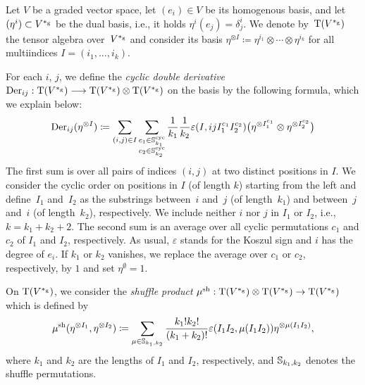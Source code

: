 \documentclass[\MainFolder/Text.tex]{subfiles}
\begin{document}
\begin{Definition}\label{Def:DefOfHochOp}
Let $V$ be a graded vector space, let $(e_i)\in V$ be its homogenous basis, and let $(\eta^i)\subset V^{*_{\mathrm{g}}}$ be the dual basis, i.e., it holds $\eta^i(e_j) = \delta^i_j$. We denote by~$\mathrm{T}(V^{*_{\mathrm{g}}})$ the tensor algebra over~$V^{*_{\mathrm{g}}}$ and consider its basis $\eta^{\otimes I} \coloneqq \eta^{i_1} \otimes \dotsb \otimes \eta^{i_k}$ for all multiindices $I = (i_1,\dotsc,i_k)$.

For each $i$, $j$, we define the \emph{cyclic double derivative} $\mathrm{Der}_{ij}:\mathrm{T}(V^{*_{\mathrm{g}}}) \longrightarrow \mathrm{T}(V^{*_{\mathrm{g}}}) \otimes \mathrm{T}(V^{*_{\mathrm{g}}})$ on the basis by the following formula, which we explain below:
\begin{equation}\label{Eq:DoubleDeriv}
\mathrm{Der}_{ij}(\eta^{\otimes I}) \coloneqq \sum_{(i,j)\in I} \sum_{\substack{c_1 \in \mathbb{S}^{\mathrm{cyc}}_{k_1}\\ c_2 \in \mathbb{S}^{\mathrm{cyc}}_{k_2}}}\frac{1}{k_1}\frac{1}{k_2}\varepsilon(I,ijI_1^{c_1}I_2^{c_2}) \bigl(\eta^{\otimes I_1^{c_1}} \otimes \eta^{\otimes I_2^{c_2}}\bigr)
\end{equation}
The first sum is over all pairs of indices $(i,j)$ at two distinct positions in $I$. We consider the cyclic order on positions in $I$ (of length $k$) starting from the left and define~$I_1$ and~$I_2$ as the substrings between~$i$ and~$j$ (of length~$k_1$) and between~$j$ and~$i$ (of length~$k_2$), respectively. We include neither $i$ nor $j$ in $I_1$ or $I_2$, i.e., $k= k_1 + k_2 + 2$. The second sum is an average over all cyclic permutations $c_1$ and $c_2$ of $I_1$ and $I_2$, respectively. As usual, $\varepsilon$ stands for the Koszul sign and $i$ has the degree of $e_i$. If $k_1$ or $k_2$ vanishes, we replace the average over $c_1$ or $c_2$, respectively, by $1$ and set $\eta^{\emptyset} = 1$.

On $\mathrm{T}(V^{*_{\mathrm{g}}})$, we consider the \emph{shuffle product} $\mu^{\mathrm{sh}}: \mathrm{T}(V^{*_{\mathrm{g}}})\otimes\mathrm{T}(V^{*_{\mathrm{g}}}) \rightarrow \mathrm{T}(V^{*_{\mathrm{g}}})$ which is defined by
\[ \mu^{\mathrm{sh}}(\eta^{\otimes I_1},\eta^{\otimes I_2}) \coloneqq  \sum_{\mu\in\mathbb{S}_{k_1,k_2}} \frac{k_1! k_2!}{(k_1 + k_2)!} \varepsilon(I_1 I_2, \mu(I_1 I_2)) \eta^{\otimes\mu(I_1 I_2)}, \]
where $k_1$ and $k_2$ are the lengths of $I_1$ and $I_2$, respectively, and $\mathbb{S}_{k_1,k_2}$ denotes the shuffle permutations.


\end{Definition}
\end{document}
